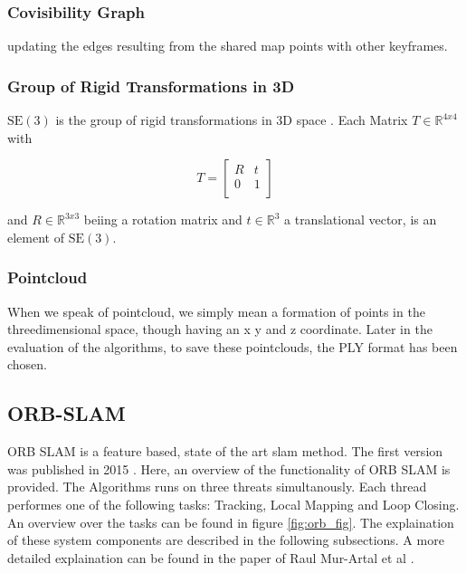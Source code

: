 		\subsubsection{Covisibility Graph}
		
		updating the edges resulting from the shared map
		points with other keyframes.
		
		\subsubsection{Group of Rigid Transformations in 3D}
		
		$\text{SE}(3)$ is the group of rigid transformations in 3D space \cite{se3}. Each Matrix $ T \in \mathbb{R}^{4x4}$ with 
		
		$$ T = \left[
		\begin{array}{rrr}
		R &  t \\  
		0  & 1 \\ 
		\end{array} \right]$$
		
		and $ R \in \mathbb{R}^{3x3}$ beiing a rotation matrix and $ t \in \mathbb{R}^{3}$ a translational vector, is an element of $\text{SE}(3)$.
		
		\subsubsection{Pointcloud}
		
		When we speak of pointcloud, we simply mean a formation of points in the threedimensional space, though having
		an x y and z coordinate. Later in the evaluation of the algorithms, to save these pointclouds, the PLY format has 
		been chosen. 

	\subsection{ORB-SLAM}
	
	ORB SLAM is a feature based, state of the art slam method. The first version was published in 2015 \cite{orb}. 
	Here, an overview of the functionality of ORB SLAM is provided. The Algorithms runs on three threats simultanously.
	Each thread performes one of the following tasks: Tracking, Local Mapping and Loop Closing. An overview over the tasks can be found 
	in figure \ref{fig:orb_fig}. The explaination of these system components are described in the following subsections. 
	A more detailed explaination can be found in the paper of Raul Mur-Artal et al \cite{orb}.
	
